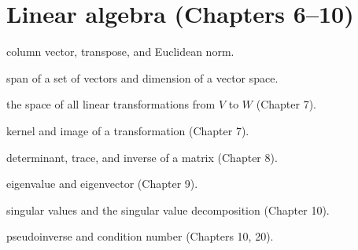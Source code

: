 \section*{Linear algebra (Chapters 6--10)}
\begin{description}[style=nextline,itemsep=0.25em]
  \item[$\mathbf{x}$, $\mathbf{x}^{\top}$, $\|\mathbf{x}\|$] column vector,
        transpose, and Euclidean norm.
  \item[$\operatorname{span} S$, $\dim V$] span of a set of vectors and dimension of
        a vector space.
  \item[$\mathcal{L}(V,W)$] the space of all linear transformations from $V$ to $W$ (Chapter 7).
  \item[$\ker T$, $\operatorname{im} T$] kernel and image of a transformation (Chapter 7).
  \item[$\det A$, $\operatorname{tr} A$, $A^{-1}$] determinant, trace, and inverse of
        a matrix (Chapter 8).
  \item[$\lambda$, $\mathbf{v}$] eigenvalue and eigenvector (Chapter 9).
  \item[$\sigma_i$, $A=U\Sigma V^{\top}$] singular values and the singular value
        decomposition (Chapter 10).
  \item[$A^{+}$, $\kappa(A)$] pseudoinverse and condition number (Chapters 10, 20).
\end{description}

